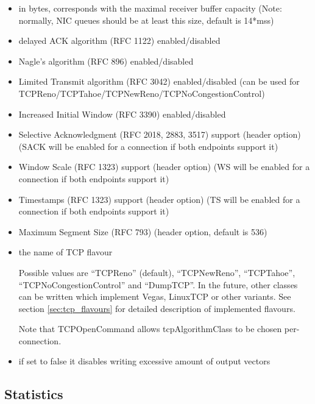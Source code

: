 \begin{itemize}
  \item {} in bytes, corresponds with the maximal receiver buffer capacity (Note: normally, NIC queues should be at least this size, default is  14*mss)
  \item {} delayed ACK algorithm (RFC 1122) enabled/disabled
  \item {} Nagle's algorithm (RFC 896) enabled/disabled
  \item {} Limited Transmit algorithm (RFC 3042) enabled/disabled (can be used for TCPReno/TCPTahoe/TCPNewReno/TCPNoCongestionControl)
  \item {} Increased Initial Window (RFC 3390) enabled/disabled
  \item {} Selective Acknowledgment (RFC 2018, 2883, 3517) support (header option) (SACK will be enabled for a connection if both endpoints support it)
  \item {} Window Scale (RFC 1323) support (header option) (WS will be enabled for a connection if both endpoints support it)
  \item {} Timestamps (RFC 1323) support (header option) (TS will be enabled for a connection if both endpoints support it)
  \item {} Maximum Segment Size (RFC 793) (header option, default is 536)
  \item {} the name of TCP flavour
  
             Possible values are ``TCPReno'' (default), ``TCPNewReno'', ``TCPTahoe'', ``TCPNoCongestionControl'' and ``DumpTCP''.
             In the future, other classes can be written which implement Vegas, LinuxTCP  or other variants.
             See section \ref{sec:tcp_flavours} for detailed description of implemented flavours.

             Note that TCPOpenCommand allows tcpAlgorithmClass to be chosen per-connection.

  \item {} if set to false it disables writing excessive amount of output vectors
\end{itemize}

\subsection{Statistics}

